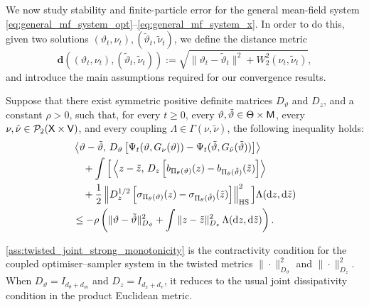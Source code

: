 We now study stability and finite-particle error for the general mean-field system
\eqref{eq:general_mf_system_opt}--\eqref{eq:general_mf_system_x}. In order to do this, given two solutions $(\vartheta_t,\nu_t),(\tilde{\vartheta}_t,\tilde{\nu}_t)$, we define the distance metric \citep{pgd_theory}
\begin{equation*}
    \mathbf{d}((\vartheta_t,\nu_t),(\tilde{\vartheta}_t,\tilde{\nu}_t)):=\sqrt{\|\vartheta_t-\tilde\vartheta_t\|^2
    +
    W_2^2(\nu_t,\tilde\nu_t)},
\end{equation*}
and introduce the main assumptions required for our convergence results.

\begin{assumption}\label{ass:twisted_joint_strong_monotonicity}
Suppose that there exist symmetric positive definite matrices $D_\vartheta$ and $D_z$, and a constant $\rho>0$, such that, for every $t\ge0$, every $\vartheta,\tilde\vartheta\in\Theta\times{\mathsf{M}}$, every $\nu,\tilde\nu\in\mathcal P_2({\mathsf{X}}\times{\mathsf{V}})$, and every coupling $\Lambda\in\Gamma(\nu,\tilde\nu)$, the following inequality holds:
\begin{align}
&\left\langle \vartheta-\tilde\vartheta,\,
    D_\vartheta
    \left[
    \Psi_t(\vartheta,G_\nu(\vartheta))
    -
    \Psi_t(\tilde\vartheta,G_{\tilde\nu}(\tilde\vartheta))
    \right]
    \right\rangle \notag\\
&\quad+
\int
\Big[
    \left\langle z-\tilde z,\,
    D_z
    \left[
    b_{\Pi_\theta(\vartheta)}(z)
    -
    b_{\Pi_\theta(\tilde\vartheta)}(\tilde z)
    \right]
    \right\rangle \notag\\
&\quad+
    \frac{1}{2}\left\|
    D_z^{1/2}
    \left[
    \sigma_{\Pi_\theta(\vartheta)}(z)
    -
    \sigma_{\Pi_\theta(\tilde\vartheta)}(\tilde z)
    \right]
    \right\|_{\mathrm{HS}}^2
\Big]\Lambda(\mathrm dz,\mathrm d\tilde z) \notag\\
&\le
-\rho\left(
    \|\vartheta-\tilde\vartheta\|_{D_\vartheta}^2
    +
    \int\|z-\tilde z\|_{D_z}^2\,
    \Lambda(\mathrm dz,\mathrm d\tilde z)
\right).
\label{eq:joint_strong_monotonicity_twisted}
\end{align}
\end{assumption}
\ref{ass:twisted_joint_strong_monotonicity} is the contractivity condition for the coupled optimiser--sampler system in the twisted metrics \(\|\cdot\|^2_{D_\vartheta}\) and \(\|\cdot\|^2_{D_z}\). When \(D_\vartheta=I_{d_\theta+d_m}\) and \(D_z=I_{d_x+d_v}\), it reduces to the usual joint dissipativity condition in the product Euclidean metric.


